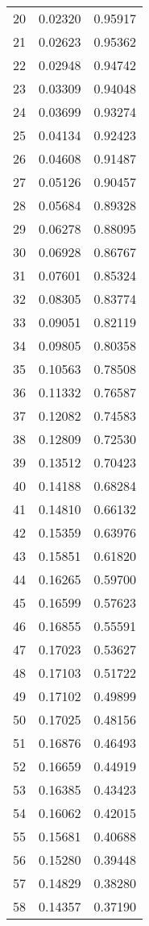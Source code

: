 \documentclass{elsarticle}
\begin{document}
\begin{center}
\begin{longtable}{|c|cc|}
  20 & 0.02320 & 0.95917 \\
  21 & 0.02623 & 0.95362 \\
  22 & 0.02948 & 0.94742 \\
  23 & 0.03309 & 0.94048 \\
  24 & 0.03699 & 0.93274 \\
  25 & 0.04134 & 0.92423 \\
  26 & 0.04608 & 0.91487 \\
  27 & 0.05126 & 0.90457 \\
  28 & 0.05684 & 0.89328 \\
  29 & 0.06278 & 0.88095 \\
  30 & 0.06928 & 0.86767 \\
  31 & 0.07601 & 0.85324 \\
  32 & 0.08305 & 0.83774 \\
  33 & 0.09051 & 0.82119 \\
  34 & 0.09805 & 0.80358 \\
  35 & 0.10563 & 0.78508 \\
  36 & 0.11332 & 0.76587 \\
  37 & 0.12082 & 0.74583 \\
  38 & 0.12809 & 0.72530 \\
  39 & 0.13512 & 0.70423 \\
  40 & 0.14188 & 0.68284 \\
  41 & 0.14810 & 0.66132 \\
  42 & 0.15359 & 0.63976 \\
  43 & 0.15851 & 0.61820 \\
  44 & 0.16265 & 0.59700 \\
  45 & 0.16599 & 0.57623 \\
  46 & 0.16855 & 0.55591 \\
  47 & 0.17023 & 0.53627 \\
  48 & 0.17103 & 0.51722 \\
  49 & 0.17102 & 0.49899 \\
  50 & 0.17025 & 0.48156 \\
  51 & 0.16876 & 0.46493 \\
  52 & 0.16659 & 0.44919 \\
  53 & 0.16385 & 0.43423 \\
  54 & 0.16062 & 0.42015 \\
  55 & 0.15681 & 0.40688 \\
  56 & 0.15280 & 0.39448 \\
  57 & 0.14829 & 0.38280 \\
  58 & 0.14357 & 0.37190 \\

\end{longtable}
\end{center}
\end{document}

